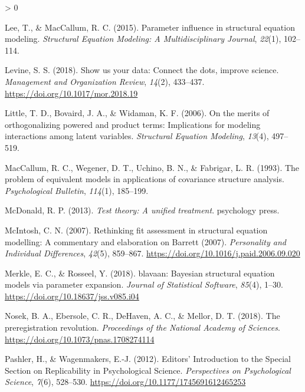 \documentclass[
  english,
  man]{apa6}
\newlength{\cslhangindent}
\newenvironment{CSLReferences}[2] %
 {%
  \setlength{\parindent}{0pt}
  \ifodd #1 \everypar{\setlength{\hangindent}{\cslhangindent}}\ignorespaces\fi
  \ifnum #2 > 0
  \setlength{\parskip}{#2\baselineskip}
  \fi
 }%
 {}
\begin{document}
\begin{CSLReferences}{1}{0}
\leavevmode\hypertarget{ref-lee2015parameter}{}%
Lee, T., \& MacCallum, R. C. (2015). Parameter influence in structural equation modeling. \emph{Structural Equation Modeling: A Multidisciplinary Journal}, \emph{22}(1), 102--114.

\leavevmode\hypertarget{ref-Levine2018}{}%
Levine, S. S. (2018). {Show us your data: Connect the dots, improve science}. \emph{Management and Organization Review}, \emph{14}(2), 433--437. \url{https://doi.org/10.1017/mor.2018.19}

\leavevmode\hypertarget{ref-little2006merits}{}%
Little, T. D., Bovaird, J. A., \& Widaman, K. F. (2006). On the merits of orthogonalizing powered and product terms: Implications for modeling interactions among latent variables. \emph{Structural Equation Modeling}, \emph{13}(4), 497--519.

\leavevmode\hypertarget{ref-MacCallum93}{}%
MacCallum, R. C., Wegener, D. T., Uchino, B. N., \& Fabrigar, L. R. (1993). The problem of equivalent models in applications of covariance structure analysis. \emph{Psychological Bulletin}, \emph{114}(1), 185--199.

\leavevmode\hypertarget{ref-mcdonald2013test}{}%
McDonald, R. P. (2013). \emph{Test theory: A unified treatment}. psychology press.

\leavevmode\hypertarget{ref-McIntosh2007}{}%
McIntosh, C. N. (2007). {Rethinking fit assessment in structural equation modelling: A commentary and elaboration on Barrett (2007)}. \emph{Personality and Individual Differences}, \emph{42}(5), 859--867. \url{https://doi.org/10.1016/j.paid.2006.09.020}

\leavevmode\hypertarget{ref-blavaan}{}%
Merkle, E. C., \& Rosseel, Y. (2018). {blavaan}: Bayesian structural equation models via parameter expansion. \emph{Journal of Statistical Software}, \emph{85}(4), 1--30. \url{https://doi.org/10.18637/jss.v085.i04}

\leavevmode\hypertarget{ref-Nosek2018}{}%
Nosek, B. A., Ebersole, C. R., DeHaven, A. C., \& Mellor, D. T. (2018). {The preregistration revolution}. \emph{Proceedings of the National Academy of Sciences}. \url{https://doi.org/10.1073/pnas.1708274114}

\leavevmode\hypertarget{ref-Pashler2012a}{}%
Pashler, H., \& Wagenmakers, E.-J. (2012). {Editors' Introduction to the Special Section on Replicability in Psychological Science}. \emph{Perspectives on Psychological Science}, \emph{7}(6), 528--530. \url{https://doi.org/10.1177/1745691612465253}


\end{CSLReferences}
\end{document}
